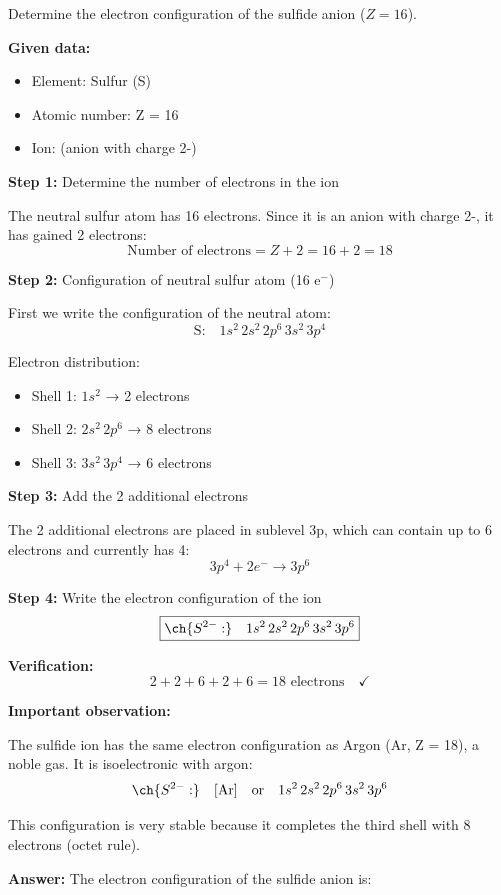 \begin{exercise}
    Determine the electron configuration of the sulfide anion  (\( Z = 16 \)).
    \begin{solu}
        \textbf{Given data:}
        \begin{itemize}
            \item Element: Sulfur (S)
            \item Atomic number: Z = 16
            \item Ion:  (anion with charge 2-)
        \end{itemize}

        \textbf{Step 1:} Determine the number of electrons in the ion

        The neutral sulfur atom has 16 electrons. Since it is an anion with charge 2-, it has gained 2 electrons:
        \[
            \text{Number of electrons} = Z + 2 = 16 + 2 = 18
        \]

        \textbf{Step 2:} Configuration of neutral sulfur atom (16 e\(^-\))

        First we write the configuration of the neutral atom:
        \[
            \text{S:} \quad 1s^2 \, 2s^2 \, 2p^6 \, 3s^2 \, 3p^4
        \]

        Electron distribution:
        \begin{itemize}
            \item Shell 1: \(1s^2\) → 2 electrons
            \item Shell 2: \(2s^2 \, 2p^6\) → 8 electrons
            \item Shell 3: \(3s^2 \, 3p^4\) → 6 electrons
        \end{itemize}

        \textbf{Step 3:} Add the 2 additional electrons

        The 2 additional electrons are placed in sublevel 3p, which can contain up to 6 electrons and currently has 4:
        \[
            3p^4 + 2e^- \rightarrow 3p^6
        \]

        \textbf{Step 4:} Write the electron configuration of the ion
        \[
            \boxed{\ch{S^{2-}:} \quad 1s^2 \, 2s^2 \, 2p^6 \, 3s^2 \, 3p^6}
        \]

        \textbf{Verification:}
        \[
            2 + 2 + 6 + 2 + 6 = 18 \text{ electrons} \quad \checkmark
        \]

        \textbf{Important observation:}

        The sulfide ion  has the same electron configuration as Argon (Ar, Z = 18), a noble gas. It is isoelectronic with argon:
        \[
            \ch{S^{2-}:} \quad [\text{Ar}] \quad \text{or} \quad 1s^2 \, 2s^2 \, 2p^6 \, 3s^2 \, 3p^6
        \]

        This configuration is very stable because it completes the third shell with 8 electrons (octet rule).

        \textbf{Answer:} The electron configuration of the sulfide anion is: 
    \end{solu}
\end{exercise}
